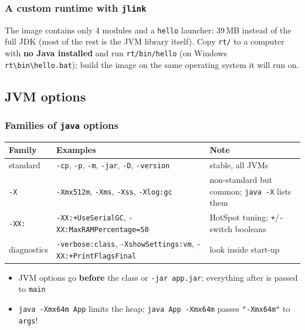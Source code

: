 \documentclass[aspectratio=169,10pt,compress]{beamer}
\begin{document}
\begin{frame}[t,fragile] \frametitle{A custom runtime with \texttt{jlink}}

  \vspace{0.2em}
  \small The image contains only 4 modules and a \texttt{hello} launcher: 39\,MB instead of the full JDK (most of the
  rest is the JVM library itself). Copy \texttt{rt/} to a computer with \textbf{no Java installed} and run \texttt{rt/bin/hello}
  (on Windows \texttt{rt\textbackslash bin\textbackslash hello.bat}); build the image on the same operating system it will run on.
\end{frame}


\subsection[Options]{JVM options}




\begin{frame}[t,fragile] \frametitle{Families of \texttt{java} options}
  \small
  \begin{tabular}{@{}L{0.2\textwidth}L{0.36\textwidth}L{0.36\textwidth}@{}}
    \toprule
    \textbf{Family} & \textbf{Examples} & \textbf{Note} \\
    \midrule
    standard        & \texttt{-cp}, \texttt{-p}, \texttt{-m}, \texttt{-jar}, \texttt{-D}, \texttt{-version} & stable, all JVMs \\
    \texttt{-X}     & \texttt{-Xmx512m}, \texttt{-Xms}, \texttt{-Xss}, \texttt{-Xlog:gc}       & non-standard but common; \texttt{java -X} lists them \\
    \texttt{-XX:}   & \texttt{-XX:+UseSerialGC}, \texttt{-XX:MaxRAMPercentage=50}             & HotSpot tuning; \texttt{+}/\texttt{-} switch booleans \\
    diagnostics     & \texttt{-verbose:class}, \texttt{-XshowSettings:vm}, \texttt{-XX:+PrintFlagsFinal} & look inside start-up \\
    \bottomrule
  \end{tabular}

  \vspace{0.5em}
  \begin{itemize}\small
    \item JVM options go \textbf{before} the class or \texttt{-jar app.jar}; everything after is passed to \texttt{main}
    \item \texttt{java -Xmx64m App} limits the heap; \texttt{java App -Xmx64m} passes \texttt{"-Xmx64m"} to \texttt{args}!
  \end{itemize}
\end{frame}
\end{document}
